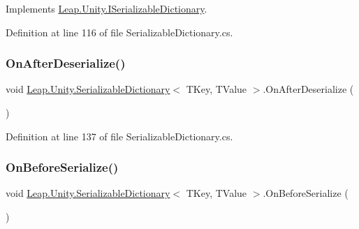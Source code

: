 Implements \mbox{\hyperlink{interface_leap_1_1_unity_1_1_i_serializable_dictionary_adaa691139a897ab05b48b4d57b083d0d}{Leap.\+Unity.\+I\+Serializable\+Dictionary}}.



Definition at line 116 of file Serializable\+Dictionary.\+cs.

\mbox{\label{class_leap_1_1_unity_1_1_serializable_dictionary_a7ea2114f250e768f7cde70359178d83d}} 
\subsubsection{\texorpdfstring{OnAfterDeserialize()}{OnAfterDeserialize()}}
{\footnotesize\ttfamily void \mbox{\hyperlink{class_leap_1_1_unity_1_1_serializable_dictionary}{Leap.\+Unity.\+Serializable\+Dictionary}}$<$ T\+Key, T\+Value $>$.On\+After\+Deserialize (\begin{DoxyParamCaption}{ }\end{DoxyParamCaption})}



Definition at line 137 of file Serializable\+Dictionary.\+cs.

\mbox{\label{class_leap_1_1_unity_1_1_serializable_dictionary_a5ee05f76684d203c2d801682b1f039ef}} 
\subsubsection{\texorpdfstring{OnBeforeSerialize()}{OnBeforeSerialize()}}
{\footnotesize\ttfamily void \mbox{\hyperlink{class_leap_1_1_unity_1_1_serializable_dictionary}{Leap.\+Unity.\+Serializable\+Dictionary}}$<$ T\+Key, T\+Value $>$.On\+Before\+Serialize (\begin{DoxyParamCaption}{ }\end{DoxyParamCaption})}



